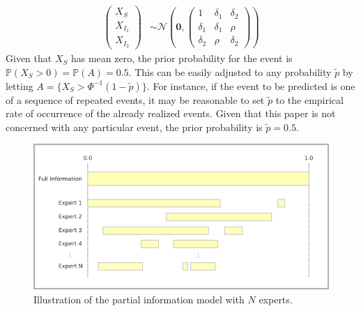 \documentclass[11pt]{article}
\renewcommand{\P}{\mathbb{P}}
\theoremstyle{definition}
\theoremstyle{definition}
\begin{document}
\begin{align}
\left(\begin{matrix} X_S \\ X_{I_1}\\ X_{I_2} \end{matrix}\right) &\sim \mathcal{N}\left(
 \boldsymbol{0},  \left(\begin{matrix} 
1 & \delta_1 & \delta_2\\
\delta_1 & \delta_1 &\rho\\
\delta_2 & \rho & \delta_2
 \end{matrix}\right)\right) \label{twoExperts}
\end{align}
Given that $X_S$ has mean zero, the prior probability for the event is $\P(X_S > 0) = \P(A) = 0.5$. This can be easily adjusted to any probability $\tilde{p}$ by letting $A = \{ X_S > \Phi^{-1}(1-\tilde{p}) \}$. For instance, if the event to be predicted is one of a sequence of repeated events,  it may be reasonable to set $\tilde{p}$ to the empirical rate of occurrence of the already realized events. Given that this paper is not concerned with any particular event, the prior probability is  $\tilde{p} = 0.5$.  

\begin{figure}[htbp]
   \includegraphics[width = \textwidth]{N=N} %
   \caption{Illustration of the partial information model with $N$ experts.}
   \label{diagramN}
\end{figure}
\end{document}
